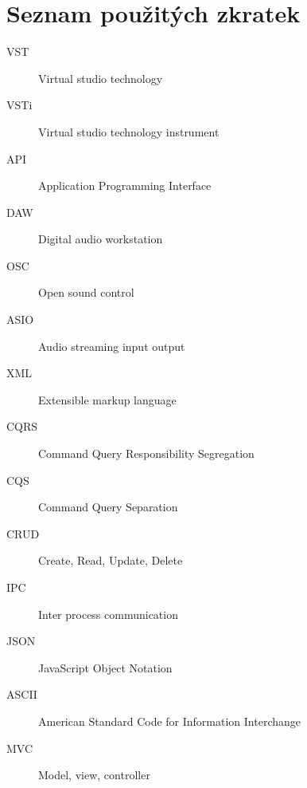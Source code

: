 \documentclass[thesis=M,czech]{FITthesis}[2019/03/06]
\begin{document}



\appendix

\chapter{Seznam použitých zkratek}
\begin{description}
	\item[VST] Virtual studio technology
	\item[VSTi] Virtual studio technology instrument
	\item[API] Application Programming Interface
	\item[DAW] Digital audio workstation
	\item[OSC] Open sound control
	\item[ASIO] Audio streaming input output
	\item[XML] Extensible markup language
	\item[CQRS] Command Query Responsibility Segregation
	\item[CQS] Command Query Separation
	\item[CRUD] Create, Read, Update, Delete
	\item[IPC] Inter process communication
	\item[JSON] JavaScript Object Notation
	\item[ASCII] American Standard Code for Information Interchange
	\item[MVC] Model, view, controller
\end{description}
\end{document}
